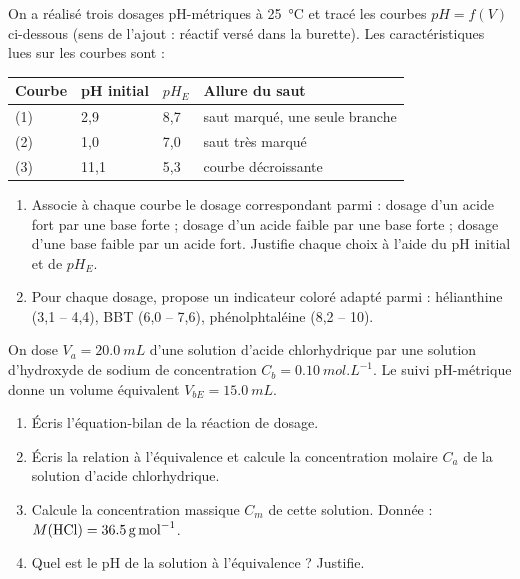\documentclass[11pt]{article}
\begin{document}
\begin{exercice}
On a réalisé trois dosages pH-métriques à \SI{25}{\celsius} et tracé les courbes $pH = f(V)$ ci-dessous (sens de l'ajout : réactif versé dans la burette). Les caractéristiques lues sur les courbes sont :

\begin{center}
\begin{tabularx}{\linewidth}{|l|X|X|X|}
\hline
\rowcolor{popblueL} Courbe & pH initial & $pH_E$ & Allure du saut \\
\hline
(1) & 2,9 & 8,7 & saut marqué, une seule branche \\
\hline
(2) & 1,0 & 7,0 & saut très marqué \\
\hline
(3) & 11,1 & 5,3 & courbe décroissante \\
\hline
\end{tabularx}
\end{center}

\begin{enumerate}
\item Associe à chaque courbe le dosage correspondant parmi : dosage d'un acide fort par une base forte ; dosage d'un acide faible par une base forte ; dosage d'une base faible par un acide fort. Justifie chaque choix à l'aide du pH initial et de $pH_E$.
\item Pour chaque dosage, propose un indicateur coloré adapté parmi : hélianthine (3,1 -- 4,4), BBT (6,0 -- 7,6), phénolphtaléine (8,2 -- 10).
\end{enumerate}
\end{exercice}

\begin{exercice}
On dose $V_a = \SI{20,0}{mL}$ d'une solution d'acide chlorhydrique  par une solution d'hydroxyde de sodium de concentration $C_b = \SI{0,10}{mol.L^{-1}}$. Le suivi pH-métrique donne un volume équivalent $V_{bE} = \SI{15,0}{mL}$.
\begin{enumerate}
\item Écris l'équation-bilan de la réaction de dosage.
\item Écris la relation à l'équivalence et calcule la concentration molaire $C_a$ de la solution d'acide chlorhydrique.
\item Calcule la concentration massique $C_m$ de cette solution. Donnée : $M(\ce{HCl}) = \SI{36,5}{g.mol^{-1}}$.
\item Quel est le pH de la solution à l'équivalence ? Justifie.
\end{enumerate}
\end{exercice}
\end{document}
